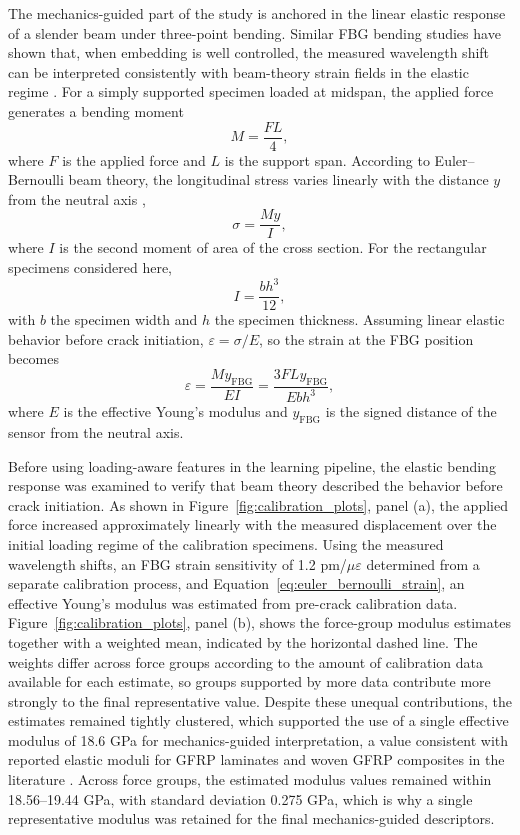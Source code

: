 \documentclass[notspecified,article,submit,pdftex,moreauthors]{Definitions/mdpi}
\newcommand{\rev}[1]{{\color{red}#1}}
\begin{document}
The mechanics-guided part of the study is anchored in the linear elastic response of a slender beam under three-point bending. Similar FBG bending studies have shown that, when embedding is well controlled, the measured wavelength shift can be interpreted consistently with beam-theory strain fields in the elastic regime \cite{gabardi2023}. For a simply supported specimen loaded at midspan, the applied force generates a bending moment
\begin{equation}
M = \frac{F L}{4},
\end{equation}
where $F$ is the applied force and $L$ is the support span. According to Euler--Bernoulli beam theory, the longitudinal stress varies linearly with the distance $y$ from the neutral axis \cite{ochsner2021},
\begin{equation}
\sigma = \frac{M y}{I},
\end{equation}
where $I$ is the second moment of area of the cross section. For the rectangular specimens considered here,
\begin{equation}
I = \frac{b h^3}{12},
\end{equation}
with $b$ the specimen width and $h$ the specimen thickness. Assuming linear elastic behavior before crack initiation, $\varepsilon = \sigma / E$, so the strain at the FBG position becomes
\begin{equation}
\varepsilon = \frac{M y_{\mathrm{FBG}}}{E I} = \frac{3 F L y_{\mathrm{FBG}}}{E b h^3},
\label{eq:euler_bernoulli_strain}
\end{equation}
where $E$ is the effective Young's modulus and $y_{\mathrm{FBG}}$ is the signed distance of the sensor from the neutral axis.

Before using loading-aware features in the learning pipeline, the elastic bending response was examined to verify that beam theory described the behavior before crack initiation. As shown in Figure~\ref{fig:calibration_plots}, panel (a), the applied force increased approximately linearly with the measured displacement over the initial loading regime of the calibration specimens. Using the measured wavelength shifts, an FBG strain sensitivity of 1.2 pm/$\mu\varepsilon$ determined from a separate calibration process, and Equation~\ref{eq:euler_bernoulli_strain}, an effective Young's modulus was estimated from pre-crack calibration data. Figure~\ref{fig:calibration_plots}, panel (b), shows the force-group modulus estimates together with a weighted mean, indicated by the horizontal dashed line. The weights differ across force groups according to the amount of calibration data available for each estimate, so groups supported by more data contribute more strongly to the final representative value. Despite these unequal contributions, the estimates remained tightly clustered, which supported the use of a single effective modulus of 18.6 GPa for mechanics-guided interpretation, a value consistent with reported elastic moduli for GFRP laminates and woven GFRP composites in the literature \cite{bazli2019,gao2016}. \rev{Across force groups, the estimated modulus values remained within 18.56--19.44 GPa, with standard deviation 0.275 GPa, which is why a single representative modulus was retained for the final mechanics-guided descriptors.}
\end{document}
